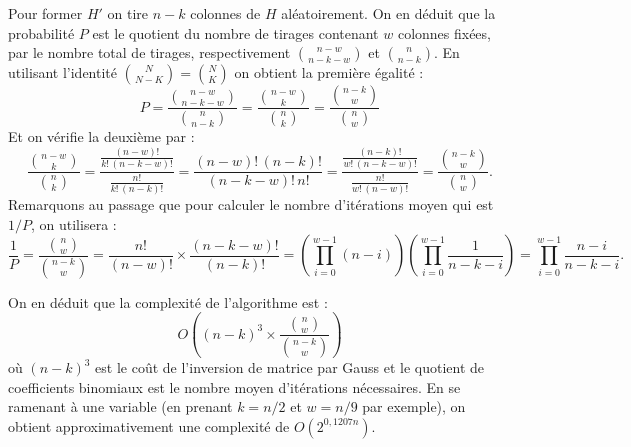 \documentclass[11pt,a4paper]{article}
\begin{document}
Pour former $H'$ on tire $n-k$ colonnes de $H$ aléatoirement.
On en déduit que la probabilité $P$ est le quotient du nombre de tirages
contenant $w$ colonnes fixées, par le nombre total de tirages, respectivement
$\binom{n-w}{n-k-w}$ et $\binom{n}{n-k}$.
En utilisant l'identité $\binom{N}{N - K} = \binom{N}{K}$ on obtient la première
égalité :
\begin{equation}
  \label{eq-P}
    P = \frac{\binom{n-w}{n-k-w}}{\binom{n}{n-k}}
      = \frac{\binom{n-w}{k}}{\binom{n}{k}}
      = \frac{\binom{n-k}{w}}{\binom{n}{w}}
\end{equation}
Et on vérifie la deuxième par :
\begin{equation*}
  \frac{\binom{n-w}{k}}{\binom{n}{k}}
  = \frac{\frac{(n-w)!}{k!\,(n-k-w)!}}{\frac{n!}{k!\,(n-k)!}}
  = \frac{(n-w)!\,(n-k)!}{(n-k-w)!\,n!}
  = \frac{\frac{(n-k)!}{w!\,(n-k-w)!}}{\frac{n!}{w!\,(n-w)!}}
  = \frac{\binom{n-k}{w}}{\binom{n}{w}}.
\end{equation*}
Remarquons au passage que pour calculer le nombre d'itérations moyen qui est
$1/P$, on utilisera :
\begin{equation*}
  \label{eq-nombre-moyen-iterations-isd}
  \frac{1}{P}
  = \frac{\binom{n}{w}}{\binom{n-k}{w}}
  = \frac{n!}{(n-w)!} \times \frac{(n-k-w)!}{(n-k)!}
  = \left(\prod_{i = 0}^{w - 1} (n - i)\right) \left(\prod_{i = 0}^{w - 1} \frac{1}{n - k - i} \right)
  = \prod_{i = 0}^{w - 1} \frac{n - i}{n - k - i}. 
\end{equation*}

On en déduit que la complexité de l'algorithme est :
\begin{equation}
    O\left((n-k)^3 \times \frac{\binom{n}{w}}{\binom{n-k}{w}}\right)
\end{equation}
où $(n-k)^3$ est le coût de l'inversion de matrice par Gauss et le quotient de
coefficients binomiaux est le nombre moyen d'itérations nécessaires.
En se ramenant à une variable (en prenant $k = n/2$ et $w = n/9$ par exemple), on
obtient approximativement une complexité de $O(2^{0,1207n})$.
\end{document}
